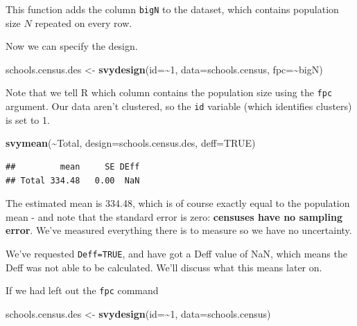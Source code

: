 \documentclass[
]{book}
\newenvironment{Shaded}{\begin{snugshade}}{\end{snugshade}}
\newcommand{\AttributeTok}[1]{\textcolor[rgb]{0.13,0.29,0.53}{#1}}
\newcommand{\ConstantTok}[1]{\textcolor[rgb]{0.56,0.35,0.01}{#1}}
\newcommand{\DecValTok}[1]{\textcolor[rgb]{0.00,0.00,0.81}{#1}}
\newcommand{\FunctionTok}[1]{\textcolor[rgb]{0.13,0.29,0.53}{\textbf{#1}}}
\newcommand{\NormalTok}[1]{#1}
\newcommand{\OtherTok}[1]{\textcolor[rgb]{0.56,0.35,0.01}{#1}}
\newcommand{\SpecialCharTok}[1]{\textcolor[rgb]{0.81,0.36,0.00}{\textbf{#1}}}
\begin{document}
This function adds the column \texttt{bigN} to the dataset, which contains
population size \(N\) repeated on every row.

Now we can specify the design.

\begin{Shaded}
\begin{Highlighting}[]
\NormalTok{schools.census.des }\OtherTok{\textless{}{-}} \FunctionTok{svydesign}\NormalTok{(}\AttributeTok{id=}\SpecialCharTok{\textasciitilde{}}\DecValTok{1}\NormalTok{, }\AttributeTok{data=}\NormalTok{schools.census, }\AttributeTok{fpc=}\SpecialCharTok{\textasciitilde{}}\NormalTok{bigN)}
\end{Highlighting}
\end{Shaded}

Note that we tell R which column contains the population size using the \texttt{fpc} argument.
Our data aren't clustered, so the \texttt{id} variable (which identifies clusters) is set to 1.

\begin{Shaded}
\begin{Highlighting}[]
\FunctionTok{svymean}\NormalTok{(}\SpecialCharTok{\textasciitilde{}}\NormalTok{Total, }\AttributeTok{design=}\NormalTok{schools.census.des, }\AttributeTok{deff=}\ConstantTok{TRUE}\NormalTok{)}
\end{Highlighting}
\end{Shaded}

\begin{verbatim}
##         mean     SE DEff
## Total 334.48   0.00  NaN
\end{verbatim}

The estimated mean is 334.48, which is of course
exactly equal to the population mean - and note that the standard error is zero:
\textbf{censuses have no sampling error}. We've measured everything there is to measure
so we have no uncertainty.

We've requested \texttt{Deff=TRUE}, and have got a Deff value of NaN, which means
the Deff was not able to be calculated. We'll discuss what this means later on.

If we had left out the \texttt{fpc} command

\begin{Shaded}
\begin{Highlighting}[]
\NormalTok{schools.census.des }\OtherTok{\textless{}{-}} \FunctionTok{svydesign}\NormalTok{(}\AttributeTok{id=}\SpecialCharTok{\textasciitilde{}}\DecValTok{1}\NormalTok{, }\AttributeTok{data=}\NormalTok{schools.census)}
\end{Highlighting}
\end{Shaded}
\end{document}
